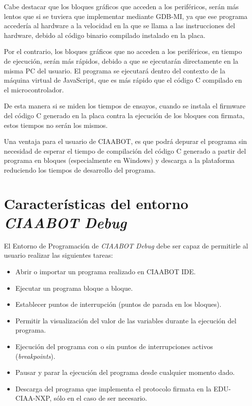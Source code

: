 Cabe destacar que los bloques gráficos que acceden a los periféricos,
serán más lentos que si se tuviera que implementar mediante GDB-MI, ya que ese programa accedería al hardware a la velocidad en la que
se llama a las instrucciones del hardware, debido al código binario compilado
instalado en la placa.

Por el contrario, los bloques gráficos que no acceden a los periféricos, en tiempo
de ejecución, serán más rápidos, debido a que se ejecutarán directamente en la
misma PC del usuario. El programa se ejecutará dentro del contexto de la máquina virtual de
JavaScript, que es más rápido que el código C compilado en el microcontrolador.

De esta manera si se miden los tiempos de ensayos, cuando se instala el firmware
del código C generado en la placa contra la ejecución de los bloques con firmata, estos tiempos no serán los mismos.

Una ventaja para el usuario de CIAABOT, es que podrá depurar el programa sin necesidad de esperar el tiempo de compilación del código C generado a partir del programa en bloques (especialmente en Windows) y descarga a la plataforma reduciendo los tiempos de desarrollo del programa.


\section{Características del entorno \emph{CIAABOT Debug}}
\label{sec:Características del entorno CIAABOT debug}

El Entorno de Programación de \emph{CIAABOT Debug} debe ser capaz de permitirle al usuario realizar las siguientes tareas:

\begin{itemize}
	\item Abrir o importar un programa realizado en CIAABOT IDE.
	\item Ejecutar un programa bloque a bloque.	
	\item Establecer puntos de interrupción  (puntos de parada en los bloques).
	\item Permitir la visualización del valor de las variables durante la ejecución del programa.
	\item Ejecución del programa con o sin puntos de interrupciones activos (\emph{breakpoints}).
	\item Pausar y parar la ejecución del programa desde cualquier momento dado.
	\item Descarga del programa que implementa el protocolo firmata en la EDU-CIAA-NXP, sólo en el caso de ser necesario.
\end{itemize}

